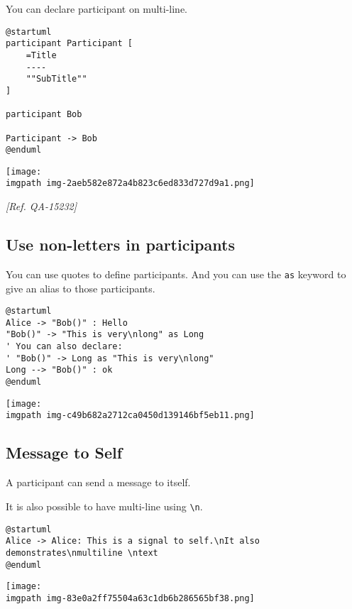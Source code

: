 You can declare participant on multi-line.


\begin{verbatim}
@startuml
participant Participant [
    =Title
    ----
    ""SubTitle""
]

participant Bob

Participant -> Bob
@enduml
\end{verbatim}
\begin{center}
\texttt{[image: \\imgpath img-2aeb582e872a4b823c6ed833d727d9a1.png]}
\end{center}


\textit{[Ref. QA-15232]}
%
%
\subsection{Use non-letters in participants}




You can use quotes to define participants.
And you can use the \texttt{as} keyword to give an alias to those participants.
\begin{verbatim}
@startuml
Alice -> "Bob()" : Hello
"Bob()" -> "This is very\nlong" as Long
' You can also declare:
' "Bob()" -> Long as "This is very\nlong"
Long --> "Bob()" : ok
@enduml
\end{verbatim}
\begin{center}
\texttt{[image: \\imgpath img-c49b682a2712ca0450d139146bf5eb11.png]}
\end{center}


%
%
\subsection{Message to Self}


A participant can send a message to itself.


It is also possible to have multi-line using \texttt{\textbackslash n}.


\begin{verbatim}
@startuml
Alice -> Alice: This is a signal to self.\nIt also demonstrates\nmultiline \ntext
@enduml
\end{verbatim}
\begin{center}
\texttt{[image: \\imgpath img-83e0a2ff75504a63c1db6b286565bf38.png]}
\end{center}


